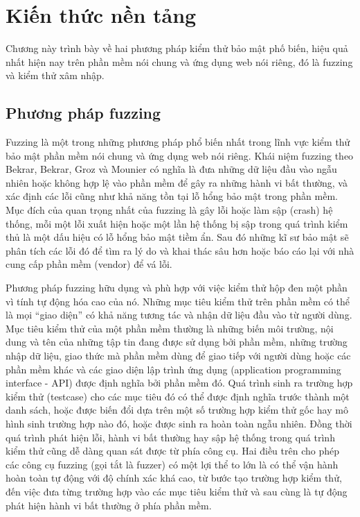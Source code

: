 \chapter{Kiến thức nền tảng}
Chương này trình bày về hai phương pháp kiểm thử bảo mật phố biến, hiệu quả nhất hiện nay trên phần mềm nói chung và ứng dụng web nói riêng, đó là fuzzing và kiểm thử xâm nhập.
\section{Phương pháp fuzzing}
Fuzzing \parencite{klees2018evaluating} là một trong những phương pháp phổ biến nhất trong lĩnh vực kiểm thử bảo mật phần mềm nói chung và ứng dụng web nói riêng. Khái niệm fuzzing theo Bekrar, Bekrar, Groz và Mounier \parencite{vimpari2015evaluation} có nghĩa là đưa những dữ liệu đầu vào ngẫu nhiên hoặc không hợp lệ vào phần mềm để gây ra những hành vi bất thường, và xác định các lỗi cũng như khả năng tồn tại lỗ hổng bảo mật trong phần mềm. Mục đích của quan trọng nhất của fuzzing là gây lỗi hoặc làm sập (crash) hệ thống, mỗi một lỗi xuất hiện hoặc một lần hệ thống bị sập trong quá trình kiểm thủ là một dấu hiệu có lỗ hổng bảo mật tiềm ẩn. Sau đó những kĩ sư bảo mật sẽ phân tích các lỗi đó để tìm ra lý do và khai thác sâu hơn hoặc báo cáo lại với nhà cung cấp phần mềm (vendor) để vá lỗi.\par
Phương pháp fuzzing hữu dụng và phù hợp với việc kiểm thử hộp đen một phần vì tính tự động hóa cao của nó. Những mục tiêu kiểm thử trên phần mềm có thể là mọi ``giao diện'' có khả năng tương tác và nhận dữ liệu đầu vào từ người dùng. Mục tiêu kiểm thử của một phần mềm thường là những biến môi trường, nội dung và tên của những tập tin đang được sử dụng bởi phần mềm, những trường nhập dữ liệu, giao thức mà phần mềm dùng để giao tiếp với người dùng hoặc các phần mềm khác và các giao diện lập trình ứng dụng (application programming interface - API) được định nghĩa bởi phần mềm đó. Quá trình sinh ra trường hợp kiểm thử (testcase) cho các mục tiêu đó có thể được định nghĩa trước thành một danh sách, hoặc được biến đổi dựa trên một số trường hợp kiểm thử gốc hay mô hình sinh trường hợp nào đó, hoặc được sinh ra hoàn toàn ngẫu nhiên. Đồng thời quá trình phát hiện lỗi, hành vi bất thường hay sập hệ thống trong quá trình kiểm thử cũng dễ dàng quan sát được từ phía công cụ. Hai điều trên cho phép các công cụ fuzzing (gọi tắt là fuzzer) có một lợi thể to lớn là có thể vận hành hoàn toàn tự động với độ chính xác khá cao, từ bước tạo trường hợp kiểm thử, đến việc đưa từng trường hợp vào các mục tiêu kiểm thử và sau cùng là tự động phát hiện hành vi bất thường ở phía phần mềm.\par
